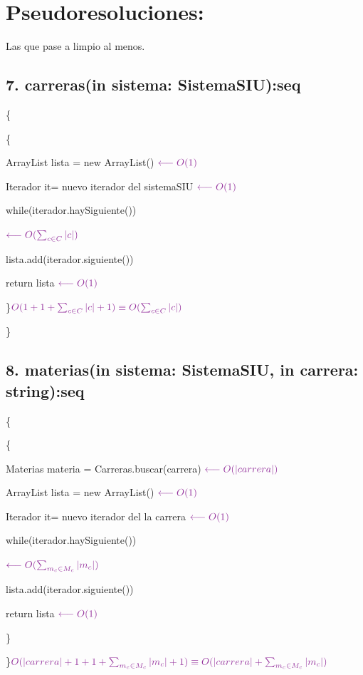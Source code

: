 \documentclass[a4paper,10pt]{article}
\begin{document}
\section*{Pseudoresoluciones:}
{\vspace*{-2ex}\hspace*{4em} \small Las que pase a limpio al menos.}


\subsection*{7. carreras(in sistema: SistemaSIU):seq}
\{

\{

    ArrayList lista = new ArrayList() \hfill $\color{Purple}\longleftarrow O(1)$
    
    Iterador it= nuevo iterador del sistemaSIU \hfill $\color{Purple}\longleftarrow O(1)$

    while(iterador.haySiguiente()){\hfill $\color{Purple}\longleftarrow O(\sum_{c\in C}^{} |c|)$

        \hspace*{1.5em} lista.add(iterador.siguiente())

    }

    return lista \hfill $\color{Purple}\longleftarrow O(1)$

\}\hfill $\color{Purple} O(1+1+\sum_{c\in C}^{} |c| +1 )\equiv O(\sum_{c\in C}^{} |c|)$

\noindent\}

\salto{\baselineskip}

\subsection*{8. materias(in sistema: SistemaSIU, in carrera: string):seq}
\{

\{

    Materias materia = Carreras.buscar(carrera) \hfill $\color{Purple}\longleftarrow O(|carrera|)$

    ArrayList lista = new ArrayList() \hfill $\color{Purple}\longleftarrow O(1)$
    
    Iterador it= nuevo iterador del la carrera \hfill $\color{Purple}\longleftarrow O(1)$

    while(iterador.haySiguiente()){\hfill $\color{Purple}\longleftarrow O(\sum_{m_c\in M_c}^{} |m_c|)$

        \hspace*{1.5em} lista.add(iterador.siguiente())

    }

    return lista \hfill $\color{Purple}\longleftarrow O(1)$

\}

\noindent\}\hfill $\color{Purple} O(|carrera|+1+1+\sum_{m_c\in M_c}^{} |m_c| +1 )\equiv O(|carrera|+\sum_{m_c\in M_c}^{} |m_c|)$

\salto{\baselineskip}
\end{document}
